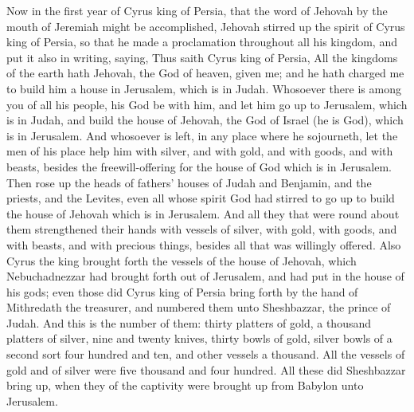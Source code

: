 


Now in the first year of Cyrus king of Persia, that the word of Jehovah by the mouth of Jeremiah might be accomplished, Jehovah stirred up the spirit of Cyrus king of Persia, so that he made a proclamation throughout all his kingdom, and put it also in writing, saying, Thus saith Cyrus king of Persia, All the kingdoms of the earth hath Jehovah, the God of heaven, given me; and he hath charged me to build him a house in Jerusalem, which is in Judah. Whosoever there is among you of all his people, his God be with him, and let him go up to Jerusalem, which is in Judah, and build the house of Jehovah, the God of Israel (he is God), which is in Jerusalem. And whosoever is left, in any place where he sojourneth, let the men of his place help him with silver, and with gold, and with goods, and with beasts, besides the freewill-offering for the house of God which is in Jerusalem.  Then rose up the heads of fathers’ houses of Judah and Benjamin, and the priests, and the Levites, even all whose spirit God had stirred to go up to build the house of Jehovah which is in Jerusalem. And all they that were round about them strengthened their hands with vessels of silver, with gold, with goods, and with beasts, and with precious things, besides all that was willingly offered. Also Cyrus the king brought forth the vessels of the house of Jehovah, which Nebuchadnezzar had brought forth out of Jerusalem, and had put in the house of his gods; even those did Cyrus king of Persia bring forth by the hand of Mithredath the treasurer, and numbered them unto Sheshbazzar, the prince of Judah. And this is the number of them: thirty platters of gold, a thousand platters of silver, nine and twenty knives, thirty bowls of gold, silver bowls of a second sort four hundred and ten, and other vessels a thousand. All the vessels of gold and of silver were five thousand and four hundred. All these did Sheshbazzar bring up, when they of the captivity were brought up from Babylon unto Jerusalem. 

